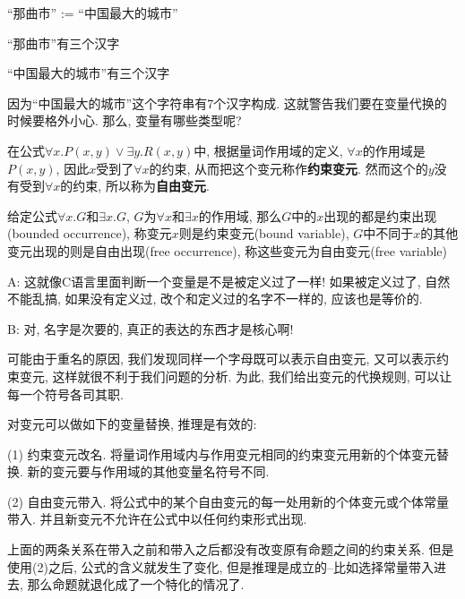 \begin{example}
	``那曲市'' := ``中国最大的城市''
	
	``那曲市''有三个汉字
	
	``中国最大的城市''有三个汉字
\end{example}

因为``中国最大的城市''这个字符串有7个汉字构成. 这就警告我们要在变量代换的时候要格外小心. 那么, 变量有哪些类型呢? 

在公式$\forall x. P(x,y)\lor \exists y. R(x,y)$中, 根据量词作用域的定义, $\forall x$的作用域是$P(x,y)$, 因此$x$受到了$\forall x$的约束, 从而把这个变元称作{\bf 约束变元}. 然而这个的$y$没有受到$\forall x$的约束, 所以称为{\bf 自由变元}. 

\begin{definition}[约束变元与自由变元]
	给定公式$\forall x. G$和$\exists x.G$, $G$为$\forall x$和$\exists x$的作用域, 那么$G$中的$x$出现的都是约束出现(bounded occurrence), 称变元$x$则是约束变元(bound variable), $G$中不同于$x$的其他变元出现的则是自由出现(free occurrence), 称这些变元为自由变元(free variable)
\end{definition}

\begin{dialogue}
	A: 这就像C语言里面判断一个变量是不是被定义过了一样! 如果被定义过了, 自然不能乱搞, 如果没有定义过, 改个和定义过的名字不一样的, 应该也是等价的. 
	
	B: 对, 名字是次要的, 真正的表达的东西才是核心啊! 
\end{dialogue}

可能由于重名的原因, 我们发现同样一个字母既可以表示自由变元, 又可以表示约束变元, 这样就很不利于我们问题的分析. 为此, 我们给出变元的代换规则, 可以让每一个符号各司其职. 

\begin{theorem}[变元的代换规则]

对变元可以做如下的变量替换, 推理是有效的: 

(1) 约束变元改名. 将量词作用域内与作用变元相同的约束变元用新的个体变元替换. 新的变元要与作用域的其他变量名符号不同. 

(2) 自由变元带入. 将公式中的某个自由变元的每一处用新的个体变元或个体常量带入. 并且新变元不允许在公式中以任何约束形式出现. 
	
\end{theorem}

上面的两条关系在带入之前和带入之后都没有改变原有命题之间的约束关系. 但是使用(2)之后, 公式的含义就发生了变化, 但是推理是成立的--比如选择常量带入进去, 那么命题就退化成了一个特化的情况了. 

